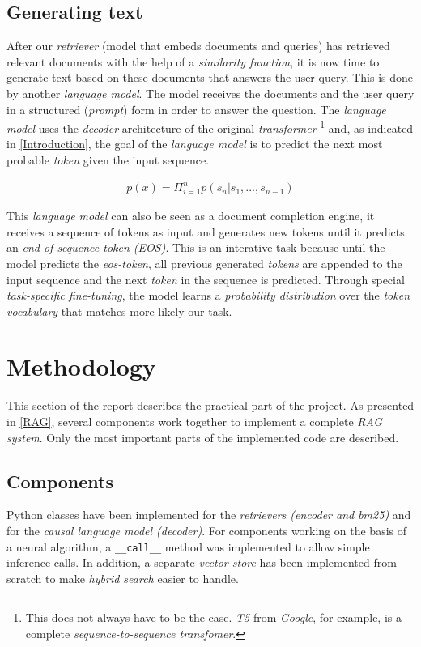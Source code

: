 \documentclass{article}
\begin{document}
\subsection{Generating text}
After our \textit{retriever} (model that embeds documents and queries) has retrieved relevant documents with the help of a \textit{similarity function}, it is now time to generate text based on these documents that answers the user query. This is done by another \textit{language model}. The model receives the documents and the user query in a structured (\textit{prompt}) form in order to answer the question. The \textit{language model} uses the \textit{decoder} architecture of the original \textit{transformer} \cite{GPT1}\footnote{This does not always have to be the case. \textit{T5} \cite{T5} from \textit{Google}, for example, is a complete \textit{sequence-to-sequence transfomer}.} and, as indicated in \cref{Introduction}, the goal of the \textit{language model} is to predict the next most probable \textit{token} given the input sequence. 

\begin{align}
	 p(x)=\Pi_{i=1}^{n}p(s_{n}|s_{1},...,s_{n-1})
\end{align}

This \textit{language model} can also be seen as a document completion engine, it receives a sequence of tokens as input and generates new tokens until it predicts an \textit{end-of-sequence token (EOS)}. This is an interative task because until the model predicts the \textit{eos-token}, all previous generated \textit{tokens} are appended to the input sequence and the next \textit{token} in the sequence is predicted. Through special \textit{task-specific fine-tuning}, the model learns a \textit{probability distribution} over the \textit{token vocabulary} that matches more likely our task.

\section{Methodology} \label{Methodology}
This section of the report describes the practical part of the project. As presented in \cref{RAG}, several components work together to implement a complete \textit{RAG system}. Only the most important parts of the implemented code are described.

\subsection{Components}
Python classes have been implemented for the \textit{retrievers (encoder and bm25)} and for the \textit{causal language model (decoder)}.  For components working on the basis of a neural algorithm, a \colorbox{lightgray!25}{\lstinline{__call__}} method was implemented to allow simple inference calls.
In addition, a separate \textit{vector store} has been implemented from scratch to make \textit{hybrid search} easier to handle.
\end{document}

